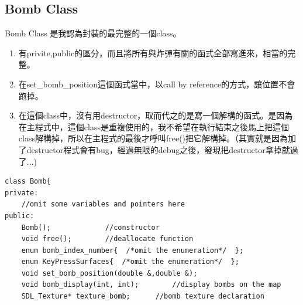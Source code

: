 \documentclass[a4paper]{article}
\theoremstyle{mystyle}	%
\begin{document}
\subsection{Bomb Class}
\label{sec:bomb}
Bomb Class 是我認為封裝的最完整的一個class。
\begin{enumerate}
\item 有privite,public的區分，而且將所有與炸彈有關的函式全部寫進來，相當的完整。
\item 在{\codefont \small set\_bomb\_position}這個函式當中，以call by reference的方式，讓位置不會跑掉。
\item 在這個class中，沒有用destructor，取而代之的是寫一個解構的函式。是因為在主程式中，這個class是重複使用的，我不希望在執行結束之後馬上把這個class解構掉，所以在主程式的最後才呼叫{\codefont \small free()}把它解構掉。（其實就是因為加了destructor程式會有bug，經過無限的debug之後，發現把destructor拿掉就過了...)
\label{itm:dstr}

\end{enumerate}
\begin{codefont}
\begin{lstlisting}[caption={show\_bomb1.h 15-88}]
class Bomb{
private:
    //omit some variables and pointers here
public:
    Bomb();             //constructor
    void free();        //deallocate function
    enum bomb_index_number{  /*omit the enumeration*/  };
    enum KeyPressSurfaces{  /*omit the enumeration*/  };
    void set_bomb_position(double &,double &);
    void bomb_display(int, int);		//display bombs on the map
    SDL_Texture* texture_bomb;      //bomb texture declaration
\end{lstlisting}
\end{codefont}
\end{document}
